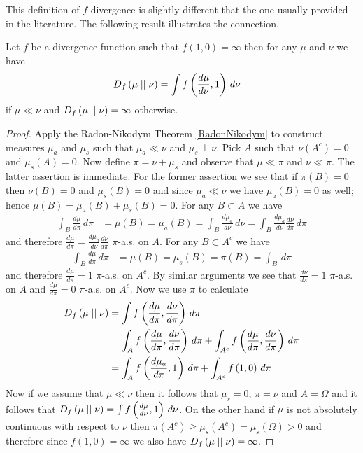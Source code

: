 This definition of $f$-divergence is slightly different that the one usually provided in the literature.  The following result illustrates the connection.

\begin{prop}\label{OneDimensionalFDivergence}Let $f$ be a divergence function such that $f(1,0) = \infty$ then for any $\mu$ and $\nu$ we have 
\begin{align*}
D_{f}\left( \mu \mid\mid \nu \right) &= \int f \left( \frac{d\mu}{d\nu}, 1 \right ) \, d\nu
\end{align*}
if $\mu \ll \nu$ and $D_{f}\left( \mu \mid\mid \nu \right) =\infty$ otherwise.  
\end{prop}
\begin{proof}
Apply the Radon-Nikodym Theorem \ref{RadonNikodym} to construct measures $\mu_a$ and $\mu_s$ such that $\mu_a \ll \nu$ and $\mu_s \perp \nu$.  Pick $A$ such that
$\nu(A^c) = 0$ and $\mu_s(A) = 0$.  Now define $\pi = \nu + \mu_s$ and observe that $\mu \ll \pi$ and $\nu \ll \pi$.  The latter assertion is immediate.  For the former assertion we see that if $\pi(B) = 0$ then $\nu(B)=0$ and $\mu_s(B)=0$ and since $\mu_a \ll \nu$ we have $\mu_a(B)=0$ as well; hence $\mu(B) = \mu_a(B) + \mu_s(B)=0$.  For any $B \subset A$ we have 
\begin{align*}
\int_B \frac{d \mu}{d \pi} \, d\pi &=\mu(B) = \mu_a(B) = \int_B \frac{d \mu_a}{d \nu} \, d\nu = \int_B \frac{d \mu_a}{d \nu} \frac{d \nu}{d \pi} \, d\pi
\end{align*}
and therefore $\frac{d \mu}{d \pi} = \frac{d \mu_a}{d \nu} \frac{d \nu}{d \pi} $ $\pi$-a.s. on $A$.  For any $B \subset A^c$ we have
\begin{align*}
\int_B \frac{d \mu}{d \pi} \, d\pi &=\mu(B) = \mu_s(B) = \pi(B) = \int_B \, d\pi
\end{align*}
and therefore $\frac{d \mu}{d \pi} = 1$ $\pi$-a.s. on $A^c$.  By similar arguments we see that $\frac{d \nu}{d \pi} = 1$ $\pi$-a.s. on $A$ and $\frac{d \mu}{d \pi} = 0$ $\pi$-a.s. on $A^c$.
Now we use $\pi$ to calculate 
\begin{align*}
D_{f}\left( \mu \mid\mid \nu \right) &= \int f \left ( \frac{d \mu}{d \pi}, \frac{d \nu}{d \pi} \right ) \, d \pi \\
&= \int_A f \left ( \frac{d \mu}{d \pi}, \frac{d \nu}{d \pi} \right ) \, d \pi + \int_{A^c} f \left ( \frac{d \mu}{d \pi}, \frac{d \nu}{d \pi} \right ) \, d \pi \\
&= \int_A f \left ( \frac{d \mu_a}{d \pi}, 1 \right ) \, d \pi + \int_{A^c} f \left( 1, 0 \right ) \, d \pi \\
\end{align*}
Now if we assume that $\mu \ll \nu$ then it follows that $\mu_s =0$, $\pi=\nu$ and $A=\Omega$ and it follows that $D_{f}\left( \mu \mid\mid \nu \right) = \int f \left ( \frac{d \mu}{d \nu}, 1 \right ) \, d \nu$.  On the other hand if $\mu$ is not absolutely continuous with respect to $\nu$ then $\pi(A^c) \geq \mu_s(A^c) = \mu_s(\Omega) > 0$ and therefore since $f \left( 1, 0 \right )=\infty$ we also have $D_{f}\left( \mu \mid\mid \nu \right) = \infty$.
\end{proof}

